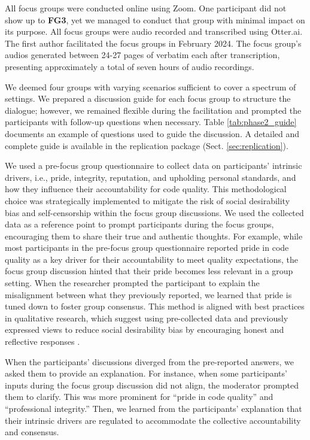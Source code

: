 All focus groups were conducted online using Zoom. One participant did not show up to \textbf{FG3}, yet we managed to conduct that group with minimal impact on its purpose. All focus groups were audio recorded and transcribed using Otter.ai. The first author facilitated the focus groups in February 2024. The focus group's audios generated between 24-27 pages of verbatim each after transcription, presenting approximately a total of seven hours of audio recordings.

We deemed four groups with varying scenarios sufficient to cover a spectrum of settings. We prepared a discussion guide for each focus group to structure the dialogue; however, we remained flexible during the facilitation and prompted the participants with follow-up questions when necessary. Table \ref{tab:phase2_guide} documents an example of questions used to guide the discussion. A detailed and complete guide is available in the replication package (Sect. \ref{sec:replication}).

We used a pre-focus group questionnaire to collect data on participants' intrinsic drivers, i.e., pride, integrity, reputation, and upholding personal standards, and how they influence their accountability for code quality. This methodological choice was strategically implemented to mitigate the risk of social desirability bias \citep{furnham1986response} and self-censorship \citep{yanos2008false} within the focus group discussions. We used the collected data as a reference point to prompt participants during the focus groups, encouraging them to share their true and authentic thoughts. For example, while most participants in the pre-focus group questionnaire reported pride in code quality as a key driver for their accountability to meet quality expectations, the focus group discussion hinted that their pride becomes less relevant in a group setting. When the researcher prompted the participant to explain the misalignment between what they previously reported, we learned that pride is tuned down to foster group consensus. This method is aligned with best practices in qualitative research, which suggest using pre-collected data and previously expressed views to reduce social desirability bias by encouraging honest and reflective responses \citep{king2000social,tourangeau2007sensitive}.

When the participants' discussions diverged from the pre-reported answers, we asked them to provide an explanation. For instance, when some participants' inputs during the focus group discussion did not align, the moderator prompted them to clarify. This was more prominent for ``pride in code quality'' and ``professional integrity.'' Then, we learned from the participants' explanation that their intrinsic drivers are regulated to accommodate the collective accountability and consensus.

